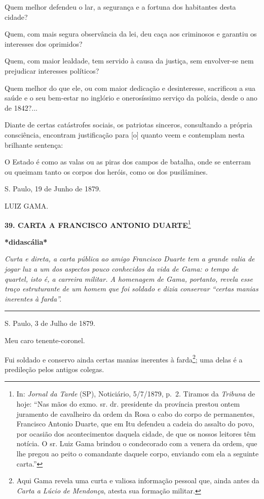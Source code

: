 Quem melhor defendeu o lar, a segurança e a fortuna dos habitantes desta
cidade?

Quem, com mais segura observância da lei, deu caça aos criminosos e
garantiu os interesses dos oprimidos?

Quem, com maior lealdade, tem servido à causa da justiça, sem
envolver-se nem prejudicar interesses políticos?

Quem melhor do que ele, ou com maior dedicação e desinteresse,
sacrificou a sua saúde e o seu bem-estar no inglório e onerosíssimo
serviço da polícia, desde o ano de 1842?...

Diante de certas catástrofes sociais, os patriotas sinceros, consultando
a própria consciência, encontram justificação para {[}o{]} quanto veem e
contemplam nesta brilhante sentença:

O Estado é como as valas ou as piras dos campos de batalha, onde se
enterram ou queimam tanto os corpos dos heróis, como os dos pusilâmines.

S. Paulo, 19 de Junho de 1879.

LUIZ GAMA.

\textbf{39. CARTA A FRANCISCO ANTONIO DUARTE}\footnote{In: \emph{Jornal
  da Tarde} (SP), Noticiário, 5/7/1879, p.~2. Tiramos da \emph{Tribuna}
  de hoje: ``Nas mãos do exmo. sr. dr. presidente da província prestou
  ontem juramento de cavalheiro da ordem da Rosa o cabo do corpo de
  permanentes, Francisco Antonio Duarte, que em Itu defendeu a cadeia do
  assalto do povo, por ocasião dos acontecimentos daquela cidade, de que
  os nossos leitores têm notícia. O sr. Luiz Gama brindou o condecorado
  com a venera da ordem, que lhe pregou ao peito o comandante daquele
  corpo, enviando com ela a seguinte carta.''}

\textbf{*didascália*}

\emph{Curta e direta, a carta pública ao amigo Francisco Duarte tem a
grande valia de jogar luz a um dos aspectos pouco conhecidos da vida de
Gama: o tempo de quartel, isto é, a carreira militar. A homenagem de
Gama, portanto, revela esse traço estruturante de um homem que foi
soldado e dizia conservar ``certas manias inerentes à farda''. }

\begin{center}\rule{0.5\linewidth}{\linethickness}\end{center}

S. Paulo, 3 de Julho de 1879.

Meu caro tenente-coronel.

Fui soldado e conservo ainda certas manias inerentes à farda\footnote{Aqui
  Gama revela uma curta e valiosa informação pessoal que, ainda antes da
  \emph{Carta a Lúcio de Mendonça}, atesta sua formação militar.}; uma
delas é a predileção pelos antigos colegas.

